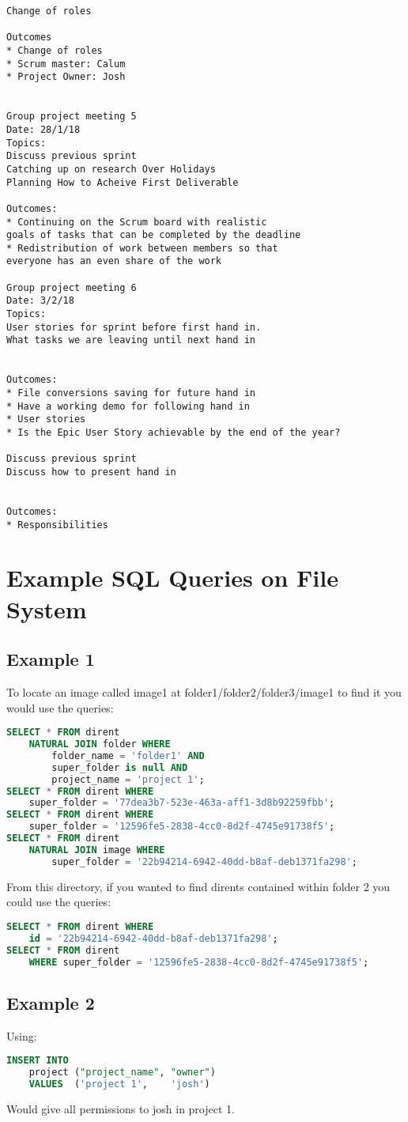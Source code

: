 \documentclass{article}
\begin{document}
\begin{lstlisting}
Change of roles

Outcomes 
* Change of roles
* Scrum master: Calum
* Project Owner: Josh


Group project meeting 5
Date: 28/1/18
Topics:
Discuss previous sprint
Catching up on research Over Holidays
Planning How to Acheive First Deliverable

Outcomes:
* Continuing on the Scrum board with realistic
goals of tasks that can be completed by the deadline
* Redistribution of work between members so that
everyone has an even share of the work

Group project meeting 6
Date: 3/2/18
Topics:
User stories for sprint before first hand in. 
What tasks we are leaving until next hand in 


Outcomes:
* File conversions saving for future hand in
* Have a working demo for following hand in 
* User stories
* Is the Epic User Story achievable by the end of the year?

Discuss previous sprint
Discuss how to present hand in 


Outcomes:
* Responsibilities
\end{lstlisting}

\section{Example SQL Queries on File System} \label{app:sql}
\subsection{Example 1}
To locate an image called image1 at folder1/folder2/folder3/image1 to find it you would use the queries:
\begin{lstlisting}[language=SQL]
SELECT * FROM dirent
    NATURAL JOIN folder WHERE
        folder_name = 'folder1' AND
        super_folder is null AND
        project_name = 'project 1';
SELECT * FROM dirent WHERE
    super_folder = '77dea3b7-523e-463a-aff1-3d8b92259fbb';
SELECT * FROM dirent WHERE
    super_folder = '12596fe5-2838-4cc0-8d2f-4745e91738f5';
SELECT * FROM dirent
    NATURAL JOIN image WHERE
        super_folder = '22b94214-6942-40dd-b8af-deb1371fa298';
\end{lstlisting}

From this directory, if you wanted to find dirents contained within folder 2 you could use the
queries:
\begin{lstlisting}[language=SQL]
SELECT * FROM dirent WHERE
    id = '22b94214-6942-40dd-b8af-deb1371fa298';
SELECT * FROM dirent
    WHERE super_folder = '12596fe5-2838-4cc0-8d2f-4745e91738f5';
\end{lstlisting}

\subsection{Example 2}
Using:
\begin{lstlisting}[language=SQL]
INSERT INTO
    project ("project_name", "owner")
    VALUES  ('project 1',    'josh')
\end{lstlisting}

Would give all permissions to josh in project 1.
\end{document}
